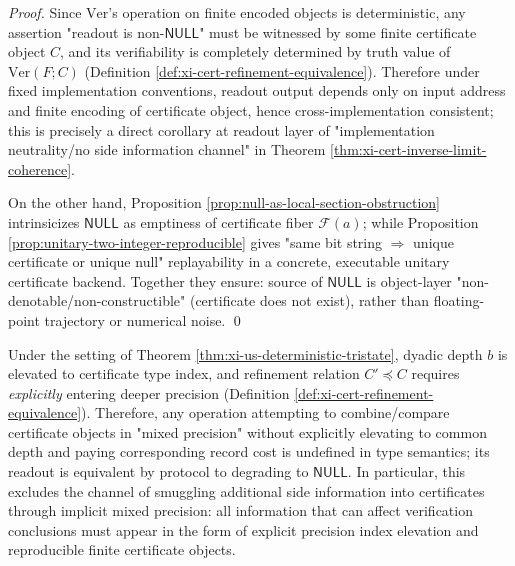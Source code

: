 \begin{proof}
Since \(\mathrm{Ver}\)'s operation on finite encoded objects is deterministic, any assertion "readout is non-\(\mathsf{NULL}\)" must be witnessed by some finite certificate object \(C\), and its verifiability is completely determined by truth value of \(\mathrm{Ver}(F;C)\) (Definition \ref{def:xi-cert-refinement-equivalence}).
Therefore under fixed implementation conventions, readout output depends only on input address and finite encoding of certificate object, hence cross-implementation consistent; this is precisely a direct corollary at readout layer of "implementation neutrality/no side information channel" in Theorem \ref{thm:xi-cert-inverse-limit-coherence}.
\par
On the other hand, Proposition \ref{prop:null-as-local-section-obstruction} intrinsicizes \(\mathsf{NULL}\) as emptiness of certificate fiber \(\mathscr F(a)\); while Proposition \ref{prop:unitary-two-integer-reproducible} gives "same bit string \(\Rightarrow\) unique certificate or unique null" replayability in a concrete, executable unitary certificate backend.
Together they ensure: source of \(\mathsf{NULL}\) is object-layer "non-denotable/non-constructible" (certificate does not exist), rather than floating-point trajectory or numerical noise. \qed
\end{proof}

\begin{corollary}\label{cor:xi-precision-type-no-leakage}
Under the setting of Theorem \ref{thm:xi-us-deterministic-tristate}, dyadic depth \(b\) is elevated to certificate type index, and refinement relation \(C'\preceq C\) requires \emph{explicitly} entering deeper precision (Definition \ref{def:xi-cert-refinement-equivalence}).
Therefore, any operation attempting to combine/compare certificate objects in "mixed precision" without explicitly elevating to common depth and paying corresponding record cost is undefined in type semantics; its readout is equivalent by protocol to degrading to \(\mathsf{NULL}\).
In particular, this excludes the channel of smuggling additional side information into certificates through implicit mixed precision: all information that can affect verification conclusions must appear in the form of explicit precision index elevation and reproducible finite certificate objects.
\end{corollary}


